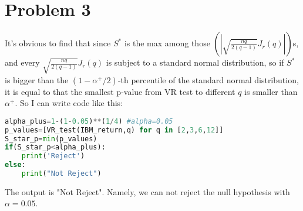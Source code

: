 \documentclass{article}
\theoremstyle{break}
\begin{document}
    \section{Problem 3}
    It's obvious to find that since $S^*$ is the max among those $(|\sqrt{\frac{nq}{2(q-1)}}J_r(q)|)$s, and every $\sqrt{\frac{nq}{2(q-1)}}J_r(q)$ is subject to a standard normal distribution, so if $S^*$ is bigger than the $(1-\alpha^+/2)$-th percentile of the standard normal distribution, it is equal to that the smallest p-value from VR test to different $q$ is smaller than $\alpha^+$. 
    \newline
    So I can write code like this:
    \begin{lstlisting}[language={python}]
alpha_plus=1-(1-0.05)**(1/4) #alpha=0.05
p_values=[VR_test(IBM_return,q) for q in [2,3,6,12]]
S_star_p=min(p_values)
if(S_star_p<alpha_plus):
    print('Reject')
else:
    print("Not Reject")     
    \end{lstlisting}
    The output is "Not Reject". Namely, we can not reject the null hypothesis with $\alpha=0.05$.
\end{document}

